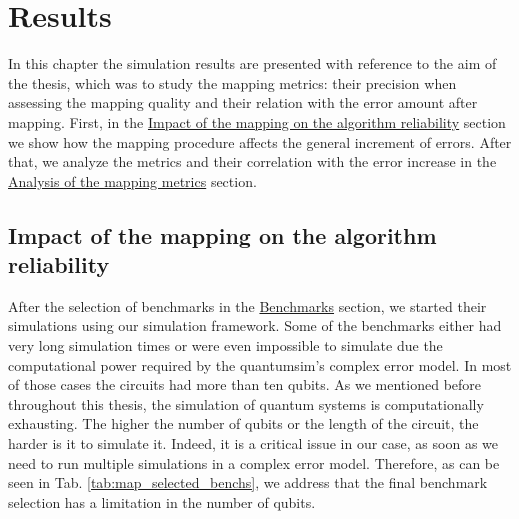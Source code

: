 
\chapter{Results}
\label{sec:orgaed8c93}

In this chapter the simulation results are presented with reference to the aim of the thesis, which was to study the mapping metrics:
their precision when assessing the mapping quality and their relation with the error amount after mapping.
First, in the \hyperref[sec:org2563966]{Impact of the mapping on the algorithm reliability} section we show how the mapping procedure affects the general increment of errors.
After that, we analyze the metrics and their correlation with the error increase in the \hyperref[sec:orgb1f6186]{Analysis of the mapping metrics} section.

\section{Impact of the mapping on the algorithm reliability}
\label{sec:org2563966}
After the selection of benchmarks in the \href{chapter-4.org}{Benchmarks} section, we started their simulations using our simulation framework.
Some of the benchmarks either had very long simulation times or were even impossible to simulate due the computational power required by the quantumsim's complex error model. 
In most of those cases the circuits had more than ten qubits.
As we mentioned before throughout this thesis, the simulation of quantum systems is computationally exhausting.
The higher the number of qubits or the length of the circuit, the harder is it to simulate it.
Indeed, it is a critical issue in our case, as soon as we need to run multiple simulations in a complex error model.
Therefore, as can be seen in Tab. \ref{tab:map_selected_benchs}, we address that the final benchmark selection has a limitation in the number of qubits.

